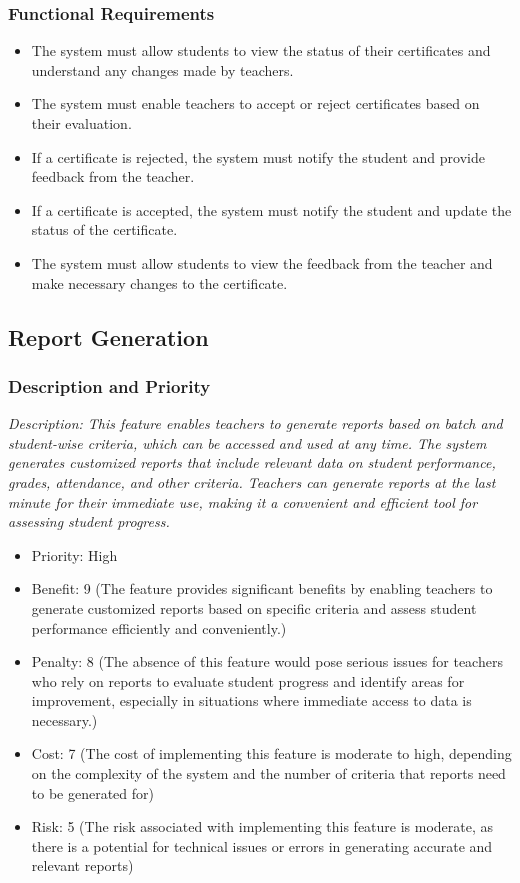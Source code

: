 \documentclass{article}
\begin{document}
\subsubsection{Functional Requirements}
\begin{itemize}
\item The system must allow students to view the status of their certificates and understand any changes made by teachers.
\item The system must enable teachers to accept or reject certificates based on their evaluation.
\item If a certificate is rejected, the system must notify the student and provide feedback from the teacher.
\item If a certificate is accepted, the system must notify the student and update the status of the certificate.
\item The system must allow students to view the feedback from the teacher and make necessary changes to the certificate.
\end{itemize}



\subsection{Report Generation}
\subsubsection{Description and Priority}
\emph{Description: This feature enables teachers to generate reports based on batch and student-wise criteria, which can be accessed and used at any time. The system generates customized reports that include relevant data on student performance, grades, attendance, and other criteria. Teachers can generate reports at the last minute for their immediate use, making it a convenient and efficient tool for assessing student progress.}
\begin{itemize}
  \item Priority: High
  \item Benefit: 9 (The feature provides significant benefits by enabling teachers to generate customized reports based on specific criteria and assess student performance efficiently and conveniently.)
  \item Penalty: 8 (The absence of this feature would pose serious issues for teachers who rely on reports to evaluate student progress and identify areas for improvement, especially in situations where immediate access to data is necessary.)
  \item Cost: 7 (The cost of implementing this feature is moderate to high, depending on the complexity of the system and the number of criteria that reports need to be generated for)
  \item Risk: 5 (The risk associated with implementing this feature is moderate, as there is a potential for technical issues or errors in generating accurate and relevant reports)
\end{itemize}
\end{document}

